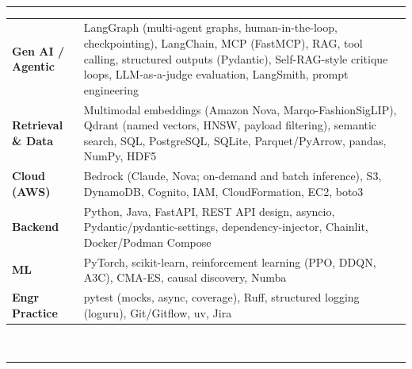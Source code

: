 \documentclass[9pt]{extarticle}
\begin{document}
    \vspace{10pt}
     \\
    \vspace{-7pt}
    \hrule
    \vspace{5pt}
    \noindent 
    \hspace{-5pt}
    \begin{tabular}{l p{16.5cm}}
        \textbf{Gen AI / Agentic} & LangGraph (multi-agent graphs, human-in-the-loop, checkpointing), LangChain, MCP (FastMCP), RAG, tool calling, structured outputs (Pydantic), Self-RAG-style critique loops, LLM-as-a-judge evaluation, LangSmith, prompt engineering \\
        \textbf{Retrieval \& Data} & Multimodal embeddings (Amazon Nova, Marqo-FashionSigLIP), Qdrant (named vectors, HNSW, payload filtering), semantic search, SQL, PostgreSQL, SQLite, Parquet/PyArrow, pandas, NumPy, HDF5 \\
        \textbf{Cloud (AWS)} & Bedrock (Claude, Nova; on-demand and batch inference), S3, DynamoDB, Cognito, IAM, CloudFormation, EC2, boto3 \\
        \textbf{Backend} & Python, Java, FastAPI, REST API design, asyncio, Pydantic/pydantic-settings, dependency-injector, Chainlit, Docker/Podman Compose \\
        \textbf{ML} & PyTorch, scikit-learn, reinforcement learning (PPO, DDQN, A3C), CMA-ES, causal discovery, Numba \\
        \textbf{Engr Practice} & pytest (mocks, async, coverage), Ruff, structured logging (loguru), Git/Gitflow, uv, Jira \\
    \end{tabular}

    \vspace{10pt}
     \\
    \vspace{-7pt}
    \hrule
\end{document}
